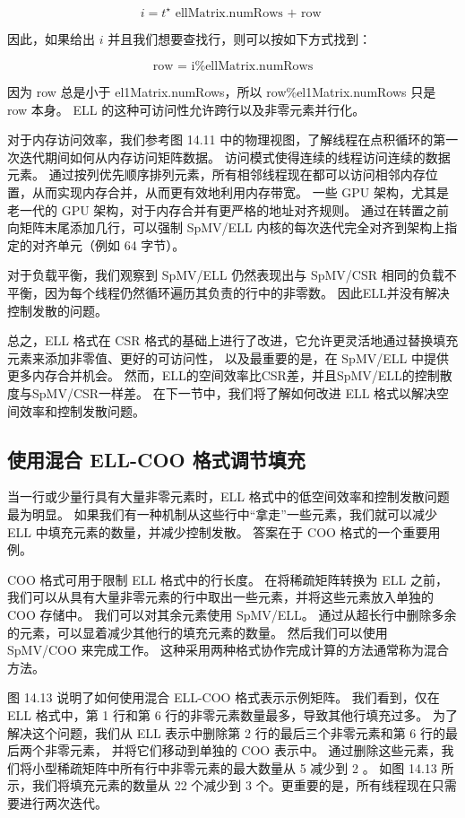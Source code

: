 $$
i=t^{\star} \text { ellMatrix.numRows + row }
$$

因此，如果给出 $i$ 并且我们想要查找行，则可以按如下方式找到：

$$
\text { row }=\text { i\%ellMatrix.numRows }
$$

因为 row 总是小于 el1Matrix.numRows，所以 row\%el1Matrix.numRows 只是 row 本身。 
ELL 的这种可访问性允许跨行以及非零元素并行化。

对于内存访问效率，我们参考图 14.11 中的物理视图，了解线程在点积循环的第一次迭代期间如何从内存访问矩阵数据。 
访问模式使得连续的线程访问连续的数据元素。 
通过按列优先顺序排列元素，所有相邻线程现在都可以访问相邻内存位置，从而实现内存合并，从而更有效地利用内存带宽。 
一些 GPU 架构，尤其是老一代的 GPU 架构，对于内存合并有更严格的地址对齐规则。 
通过在转置之前向矩阵末尾添加几行，可以强制 SpMV/ELL 内核的每次迭代完全对齐到架构上指定的对齐单元（例如 64 字节）。

对于负载平衡，我们观察到 SpMV/ELL 仍然表现出与 SpMV/CSR 相同的负载不平衡，因为每个线程仍然循环遍历其负责的行中的非零数。 
因此ELL并没有解决控制发散的问题。

总之，ELL 格式在 CSR 格式的基础上进行了改进，它允许更灵活地通过替换填充元素来添加非零值、更好的可访问性，
以及最重要的是，在 SpMV/ELL 中提供更多内存合并机会。 
然而，ELL的空间效率比CSR差，并且SpMV/ELL的控制散度与SpMV/CSR一样差。 
在下一节中，我们将了解如何改进 ELL 格式以解决空间效率和控制发散问题。

\subsection{使用混合 ELL-COO 格式调节填充}
当一行或少量行具有大量非零元素时，ELL 格式中的低空间效率和控制发散问题最为明显。 
如果我们有一种机制从这些行中“拿走”一些元素，我们就可以减少 ELL 中填充元素的数量，并减少控制发散。 
答案在于 $\mathrm{COO}$ 格式的一个重要用例。

COO 格式可用于限制 ELL 格式中的行长度。 
在将稀疏矩阵转换为 ELL 之前，我们可以从具有大量非零元素的行中取出一些元素，并将这些元素放入单独的 COO 存储中。 
我们可以对其余元素使用 SpMV/ELL。 通过从超长行中删除多余的元素，可以显着减少其他行的填充元素的数量。 
然后我们可以使用 SpMV/COO 来完成工作。 这种采用两种格式协作完成计算的方法通常称为混合方法。

图 14.13 说明了如何使用混合 ELL-COO 格式表示示例矩阵。 
我们看到，仅在 ELL 格式中，第 1 行和第 6 行的非零元素数量最多，导致其他行填充过多。 
为了解决这个问题，我们从 ELL 表示中删除第 2 行的最后三个非零元素和第 6 行的最后两个非零元素，
并将它们移动到单独的 $\mathrm{COO}$ 表示中。 
通过删除这些元素，我们将小型稀疏矩阵中所有行中非零元素的最大数量从 5 减少到 2 。 
如图 14.13 所示，我们将填充元素的数量从 22 个减少到 3 个。更重要的是，所有线程现在只需要进行两次迭代。

